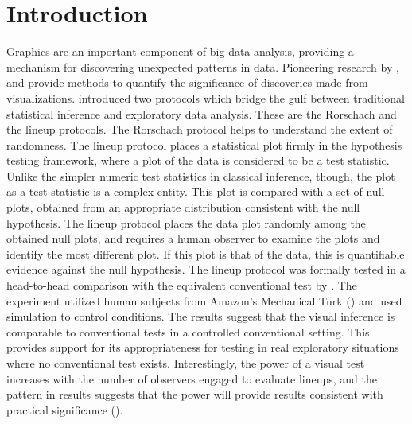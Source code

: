 \documentclass[12]{article}
\begin{document}

\section{Introduction} 
Graphics are an important component of big data analysis, providing a mechanism for discovering unexpected patterns in data. Pioneering research by \citet{gelman:2004}, \citet{buja:2009} and \cite{majumder:2011} provide methods to quantify the significance of discoveries made from visualizations. %
\cite{buja:2009} introduced two protocols which bridge the gulf between traditional statistical inference and exploratory data analysis. These are the Rorschach and the lineup protocols. The Rorschach protocol helps to understand the extent of randomness. The lineup protocol places a statistical plot firmly in the hypothesis testing framework, where a plot of the data is considered to be a test statistic. Unlike the simpler numeric test statistics in classical inference, though, the plot as a test statistic is a complex entity. This plot is compared with a set of null plots, obtained from an appropriate distribution consistent with the null hypothesis. The lineup protocol places the data plot randomly among the obtained null plots, and requires a human observer to examine the plots and identify the most different plot. If this plot is that of the data, this is quantifiable evidence against the null hypothesis. 
The lineup protocol was formally tested in a head-to-head comparison with the equivalent conventional test by \cite{majumder:2011}. The experiment utilized human subjects from Amazon's Mechanical Turk (\cite{turk}) and used simulation to control conditions. The results suggest that the visual inference is comparable to conventional tests in a controlled conventional setting. This provides support for its appropriateness for testing in real exploratory situations where no conventional test exists. Interestingly, the power of a visual test increases with the number of observers engaged to evaluate lineups, and the pattern in results suggests that the power will provide results consistent with practical significance (\cite{kirk:1996}).
\end{document}
